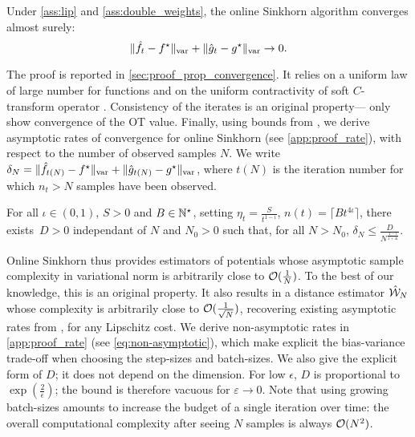 \begin{proposition}\label{prop:convergence_true}
    Under \autoref{ass:lip} and
    \ref{ass:double_weights}, the online Sinkhorn algorithm converges almost surely:
    \begin{equation}
        \Vert \hat f_t - f^\star \Vert_{\text{\upshape var}} + \Vert \hat g_t - g^\star \Vert_{\text{\upshape var}} \to 0.
    \end{equation}
\end{proposition}

The proof is reported in \autoref{sec:proof_prop_convergence}. It relies on a uniform
law of large number for functions \citep[][chapter
19]{van_der_vaart_asymptotic_2000} and on the uniform contractivity of soft
$C$-transform operator \citep[e.g.][Proposition 19]{vialard2019elementary}. Consistency of the iterates is an original property---\cite{2016-genevay-nips} only show convergence of the OT value. Finally, using bounds from \cite{moulines_non-asymptotic_2011}, we derive  asymptotic rates of convergence for online Sinkhorn (see \autoref{app:proof_rate}), with
respect to the number of observed samples $N$. We write $\delta_N = \Vert \hat
f_{t(N)} - f^\star \Vert_{\text{\upshape var}} + \Vert \hat g_{t(N)} - g^\star \Vert_{\text{\upshape var}}$,
where $t(N)$ is the iteration number for which $n_t > N$ samples have been observed.

\begin{proposition}\label{prop:rate}
    For all $\iota \in (0, 1)$, $S > 0$ and $B \in \mathbb{N}^\star$, setting $\eta_t =
    \frac{S}{t^{1 - \iota}}$, $n(t) = \lceil B t^{4\iota} \rceil$, there
    exists~$D > 0$ independant of $N$ and $N_0 > 0$ such that, for all $N >
    N_0$, $\delta_N \leq \frac{D}{N^{\frac{1 - \iota}{1 + 4 \iota}}}$.
\end{proposition}

Online Sinkhorn thus provides estimators of potentials whose asymptotic sample
complexity in variational norm is arbitrarily close to $\mathcal{O}(\frac{1}{N})$. To
the best of our knowledge, this is an original property. It also results in a
distance estimator $\hat {\mathcal{W}}_N$ whose complexity is arbitrarily close to
$\mathcal{O}(\frac{1}{\sqrt{N}})$, recovering existing asymptotic rates from
\cite{2019-Genevay-aistats}, for any Lipschitz cost. We derive non-asymptotic rates in \autoref{app:proof_rate}
(see \eqref{eq:non-asymptotic}), which make explicit the bias-variance trade-off
when choosing the step-sizes and batch-sizes. We also give the explicit form
of $D$; it does not depend on the dimension. For low $\epsilon$,
$D$ is proportional to $\exp(\frac{2}{\epsilon})$; the bound is therefore vacuous for
$\varepsilon \to 0$. Note that using growing
batch-sizes amounts to increase the budget of a single iteration over time: the
overall computational complexity after seeing $N$ samples is always $\mathcal{O}(N^2)$. 

